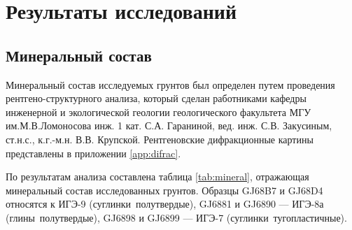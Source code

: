 \chapter{Результаты исследований}\label{ch:ch7}


\section{Минеральный состав}

Минеральный состав исследуемых грунтов был определен путем проведения 
рентгено-структурного 
анализа, который сделан работниками кафедры  инженерной и экологической геологии 
геологического факультета МГУ им.М.В.Ломоносова
инж. 1 кат. С.А. Гараниной, вед. инж. С.В. Закусиным, ст.н.с., к.г.-м.н. В.В. Крупской.
Рентгеновские дифракционные картины представлены в приложении \ref{app:difrac}.

По результатам анализа составлена таблица \ref{tab:mineral}, отражающая минеральный состав 
исследованных грунтов. Образцы GJ68B7 и GJ68D4 относятся к ИГЭ-9 (суглинки полутвердые), GJ6881 и GJ6890 --- ИГЭ-8а (глины полутвердые), 
GJ6898 и GJ6899 --- ИГЭ-7 (суглинки тугопластичные).

